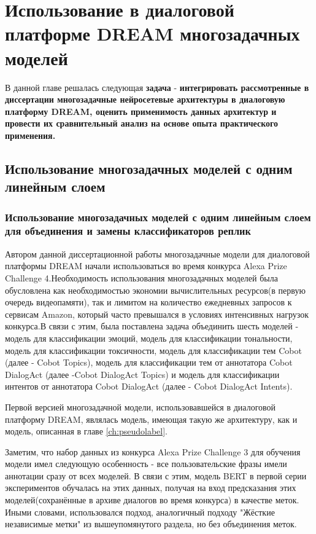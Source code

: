  \chapter{ Использование в диалоговой платформе {DREAM} многозадачных моделей}\label{ch:mtldream}
В данной главе решалась следующая \textbf{задача} - \textbf{интегрировать рассмотренные в диссертации многозадачные нейросетевые архитектуры в диалоговую платформу DREAM, оценить применимость данных архитектур и провести их сравнительный анализ на основе опыта практического применения.}

\section{Использование многозадачных моделей с одним линейным слоем }
\subsection{Использование многозадачных моделей с одним линейным слоем для объединения и замены классификаторов реплик}
Автором данной диссертационной работы многозадачные модели для диалоговой платформы {DREAM} начали использоваться во время конкурса Alexa Prize Challenge 4.Необходимость использования многозадачных моделей была обусловлена как необходимостью экономии вычислительных ресурсов(в первую очередь видеопамяти),
так и лимитом на количество ежедневных запросов к сервисам Amazon, который часто превышался в условиях интенсивных нагрузок конкурса.В связи с этим, была поставлена задача объединить шесть моделей - модель для классификации эмоций, модель для классификации тональности, модель для классификации токсичности, модель для классификации тем Cobot (далее - Cobot Topics), модель для классификации тем от аннотатора Cobot DialogAct (далее -Cobot DialogAct Topics) и модель для классификации интентов от аннотатора Cobot DialogAct (далее - Cobot DialogAct Intents).

Первой версией многозадачной модели, использовавшейся в диалоговой платформу DREAM, являлась модель, имеющая такую же архитектуру,
как и модель, описанная в главе \ref{ch:pseudolabel}.

Заметим, что набор данных из конкурса Alexa Prize Challenge 3 для обучения модели имел следующую особенность - все пользовательские фразы имели аннотации сразу от всех моделей. В связи с этим, модель BERT в первой серии экспериментов обучалась на этих данных, получая на вход предсказания этих моделей(сохранённые в архиве диалогов во время конкурса) в качестве меток. Иными словами, использовался подход, аналогичный подходу "Жёсткие независимые метки" из вышеупомянутого раздела, но без объединения меток. 
 

